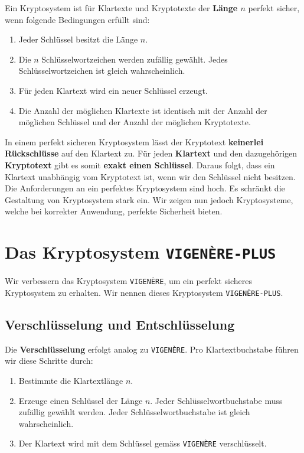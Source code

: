 \begin{definition}
Ein Kryptosystem ist für Klartexte und Kryptotexte der \textbf{Länge $n$} perfekt sicher, wenn folgende Bedingungen erfüllt sind:

\begin{enumerate}
	\item Jeder Schlüssel besitzt die Länge $n$. 
	\item Die $n$ Schlüsselwortzeichen werden zufällig gewählt. Jedes Schlüsselwortzeichen ist gleich wahrscheinlich.
	\item Für jeden Klartext wird ein neuer Schlüssel erzeugt.
	\item Die Anzahl der möglichen Klartexte ist identisch mit der Anzahl der möglichen Schlüssel und der Anzahl der möglichen Kryptotexte.
\end{enumerate}

\end{definition}

In einem perfekt sicheren Kryptosystem lässt der Kryptotext \textbf{keinerlei Rückschlüsse} auf den Klartext zu. Für jeden \textbf{Klartext} und den dazugehörigen \textbf{Kryptotext} gibt es somit \textbf{exakt einen Schlüssel}. Daraus folgt, dass ein Klartext unabhängig	vom Kryptotext ist, wenn wir den Schlüssel nicht besitzen. Die Anforderungen an ein perfektes Kryptosystem sind hoch. Es schränkt die Gestaltung von Kryptosystem stark ein. Wir zeigen nun jedoch Kryptosysteme, welche bei korrekter Anwendung, perfekte Sicherheit bieten.

\section{Das Kryptosystem \texttt{VIGENÈRE-PLUS}}

Wir verbessern das Kryptosystem \texttt{VIGENÈRE}, um ein perfekt sicheres Kryptosystem zu erhalten. Wir nennen dieses Kryptosystem \texttt{VIGENÈRE-PLUS}.

\subsection{Verschlüsselung und Entschlüsselung}

Die \textbf{Verschlüsselung} erfolgt analog zu \texttt{VIGENÈRE}. Pro Klartextbuchstabe führen wir diese Schritte durch:

\begin{enumerate}
	\item Bestimmte die Klartextlänge $n$.
	\item Erzeuge einen Schlüssel der Länge $n$. Jeder Schlüsselwortbuchstabe muss zufällig gewählt werden. Jeder Schlüsselwortbuchstabe ist gleich wahrscheinlich.
	\item Der Klartext wird mit dem Schlüssel gemäss \texttt{VIGENÈRE} verschlüsselt.
\end{enumerate}

